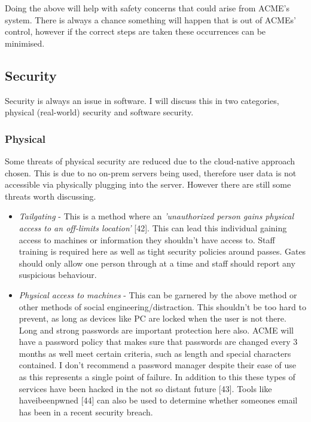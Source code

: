   Doing the above will help with safety concerns that could arise from ACME's system. There is always a chance something will happen that is out of 
  ACMEs' control, however if the correct steps are taken these occurrences can be minimised.

  \subsection{Security}
  Security is always an issue in software. I will discuss this in two categories, physical (real-world) security and software security.

  \subsubsection{Physical}
  \vspace{0.2cm}
  Some threats of physical security are reduced due to the cloud-native approach chosen. This is due to no on-prem servers being used, therefore 
  user data is not accessible via physically plugging into the server. However there are still some threats worth discussing.

  \begin{itemize}
    \item \textit{Tailgating} - This is a method where an \textit{'unauthorized person gains physical access to an off-limits location'} [42]. This can 
    lead this individual gaining access to machines or information they shouldn't have access to. Staff training is required here as well as tight security
    policies around passes. Gates should only allow one person through at a time and staff should report any suspicious behaviour.

    \item \textit{Physical access to machines} - This can be garnered by the above method or other methods of social engineering/distraction. This shouldn't
    be too hard to prevent, as long as devices like PC are locked when the user is not there. Long and strong passwords are important protection here also.
    ACME will have a password policy that makes sure that passwords are changed every 3 months as well meet certain criteria, such as length and special
    characters contained. I don't recommend a password manager despite their ease of use as this represents a single point of failure. In addition to this
    these types of services have been hacked in the not so distant future [43]. Tools like haveibeenpwned [44] can also be used to determine whether someones
    email has been in a recent security breach.
  
  \end{itemize}

